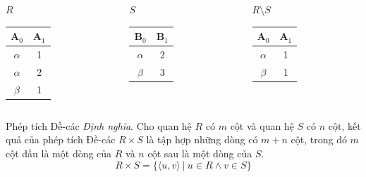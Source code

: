 \documentclass[11pt]{beamer}
\begin{document}
  \begin{frame}
    \begin{columns}[T]
      \begin{column}{0.3\textwidth}
        \centering $R$
        \medskip \\
        \begin{tabular}{|c|c|}
          \hline
          $\textbf{A}_0$ & $\textbf{A}_1$ \\[0.5ex] \hline\hline
          $\alpha$ & 1 \\ \hline
          $\alpha$ & 2 \\ \hline
          $\beta$ & 1 \\ \hline
        \end{tabular}
      \end{column}
      \begin{column}{0.3\textwidth}
        \centering $S$
        \medskip \\
        \begin{tabular}{|c|c|}
          \hline
          $\textbf{B}_0$ & $\textbf{B}_1$ \\[0.5ex] \hline\hline
          $\alpha$ & 2 \\ \hline
          $\beta$ & 3 \\ \hline
        \end{tabular}
      \end{column}
      \begin{column}{0.3\textwidth}
        \centering $R \setminus S$
        \medskip \\
        \begin{tabular}{|c|c|}
          \hline
          $\textbf{A}_0$ & $\textbf{A}_1$ \\[0.5ex] \hline\hline
          $\alpha$ & 1 \\ \hline
          $\beta$ & 1 \\ \hline
        \end{tabular}
      \end{column}
    \end{columns}
  \end{frame}
  \begin{frame}{Phép tích Đề-các}
    \textit{Định nghĩa}. Cho quan hệ $R$ có $m$ cột và quan hệ $S$ có $n$ cột, 
    kết quả của phép tích Đề-các $R \times S$ là tập hợp những dòng có $m + n$ cột, 
    trong đó $m$ cột đầu là một dòng của $R$ và $n$ cột sau là một dòng của $S$.
    $$R \times S = \{\langle u, v\rangle \ |\ u \in R \wedge v \in S\}$$
  \end{frame}
\end{document}
